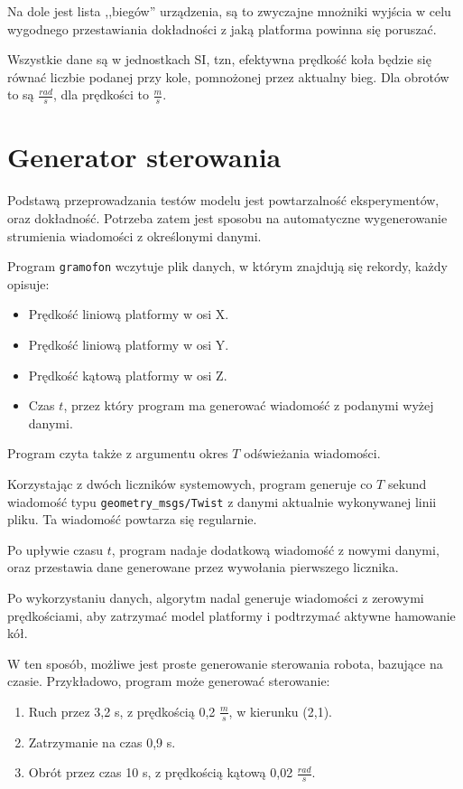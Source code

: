		Na dole jest lista ,,biegów'' urządzenia, są to zwyczajne mnożniki wyjścia w celu wygodnego przestawiania dokładności z jaką platforma powinna się poruszać.
		
		Wszystkie dane są w jednostkach SI, tzn, efektywna prędkość koła będzie się równać liczbie podanej przy kole, pomnożonej przez aktualny bieg.
		Dla obrotów to są $\frac{rad}{s}$, dla prędkości to $\frac{m}{s}$.
		
\section{Generator sterowania}
	\label{sec:gramofon}
	Podstawą przeprowadzania testów modelu jest powtarzalność eksperymentów, oraz dokładność.
	Potrzeba zatem jest sposobu na automatyczne wygenerowanie strumienia wiadomości z określonymi danymi.
	
	Program \texttt{gramofon} wczytuje plik danych, w którym znajdują się rekordy, każdy opisuje:
	\begin{itemize}
		\item Prędkość liniową platformy w osi X.
		\item Prędkość liniową platformy w osi Y.
		\item Prędkość kątową platformy w osi Z.
		\item Czas $t$, przez który program ma generować wiadomość z podanymi wyżej danymi.
	\end{itemize}
	Program czyta także z argumentu okres $T$ odświeżania wiadomości.
	
	Korzystając z dwóch liczników systemowych, program generuje co $T$ sekund wiadomość typu \texttt{geometry\_msgs/Twist} z danymi aktualnie wykonywanej linii pliku.
	Ta wiadomość powtarza się regularnie.
	
	Po upływie czasu $t$, program nadaje dodatkową wiadomość z nowymi danymi, oraz przestawia dane generowane przez wywołania pierwszego licznika.
	
	Po wykorzystaniu danych, algorytm nadal generuje wiadomości z zerowymi prędkościami, aby zatrzymać model platformy i podtrzymać aktywne hamowanie kół.
	
	W ten sposób, możliwe jest proste generowanie sterowania robota, bazujące na czasie.
	Przykładowo, program może generować sterowanie:
	\begin{enumerate}
		\item Ruch przez 3,2 s, z prędkością 0,2 $\frac{m}{s}$, w kierunku (2,1).
		\item Zatrzymanie na czas 0,9 s.
		\item Obrót przez czas 10 s, z prędkością kątową 0,02 $\frac{rad}{s}$.
	\end{enumerate}
	
